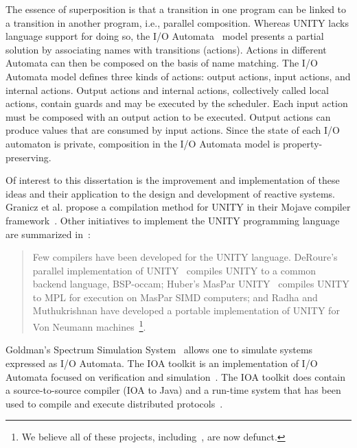 The essence of superposition is that a transition in one program can be linked to a transition in another program, i.e., parallel composition.
Whereas UNITY lacks language support for doing so, the I/O Automata~\cite{nancy1996distributed} model presents a partial solution by associating names with transitions (actions).
Actions in different Automata can then be composed on the basis of name matching.
The I/O Automata model defines three kinds of actions:  output actions, input actions, and internal actions.
Output actions and internal actions, collectively called local actions, contain guards and may be executed by the scheduler.
Each input action must be composed with an output action to be executed.
Output actions can produce values that are consumed by input actions.
Since the state of each I/O automaton is private, composition in the I/O Automata model is property-preserving.

Of interest to this dissertation is the improvement and implementation of these ideas and their application to the design and development of reactive systems.
Granicz et al. propose a compilation method for UNITY in their Mojave compiler framework~\cite{GZH03}.
Other initiatives to implement the UNITY programming language are summarized in~\cite{GZH03}:
\begin{quotation}
Few compilers have been developed for the UNITY language.
DeRoure's parallel implementation of UNITY~\cite{deroure1991parallel} compiles UNITY to a common backend language, BSP-occam; Huber's MasPar UNITY~\cite{huber1992maspar} compiles UNITY to MPL for execution on MasPar SIMD computers; and Radha and Muthukrishnan have developed a portable implementation of UNITY for Von Neumann machines~\cite{radha1993portable}\footnote{We believe all of these projects, including~\cite{GZH03}, are now defunct.}.
\end{quotation}
Goldman's Spectrum Simulation System~\cite{goldman1990distributed} allows one to simulate systems expressed as I/O Automata.
The IOA toolkit is an implementation of I/O Automata focused on verification and simulation~\cite{ioatoolkit}.
The IOA toolkit does contain a source-to-source compiler (IOA to Java) and a run-time system that has been used to compile and execute distributed protocols~\cite{georgiou2009automated}.

